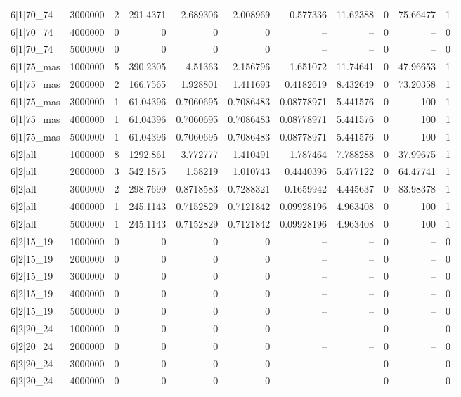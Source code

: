\begin{tabular}{lrrrrrrrrrr}
6|1|70\_74 & 3000000 & 2 & 291.4371 & 2.689306 & 2.008969 & 0.577336 & 11.62388 & 0 & 75.66477 & 1 \\
6|1|70\_74 & 4000000 & 0 & 0 & 0 & 0 & -- & -- & 0 & -- & 0 \\
6|1|70\_74 & 5000000 & 0 & 0 & 0 & 0 & -- & -- & 0 & -- & 0 \\
6|1|75\_mas & 1000000 & 5 & 390.2305 & 4.51363 & 2.156796 & 1.651072 & 11.74641 & 0 & 47.96653 & 1 \\
6|1|75\_mas & 2000000 & 2 & 166.7565 & 1.928801 & 1.411693 & 0.4182619 & 8.432649 & 0 & 73.20358 & 1 \\
6|1|75\_mas & 3000000 & 1 & 61.04396 & 0.7060695 & 0.7086483 & 0.08778971 & 5.441576 & 0 & 100 & 1 \\
6|1|75\_mas & 4000000 & 1 & 61.04396 & 0.7060695 & 0.7086483 & 0.08778971 & 5.441576 & 0 & 100 & 1 \\
6|1|75\_mas & 5000000 & 1 & 61.04396 & 0.7060695 & 0.7086483 & 0.08778971 & 5.441576 & 0 & 100 & 1 \\
6|2|all & 1000000 & 8 & 1292.861 & 3.772777 & 1.410491 & 1.787464 & 7.788288 & 0 & 37.99675 & 1 \\
6|2|all & 2000000 & 3 & 542.1875 & 1.58219 & 1.010743 & 0.4440396 & 5.477122 & 0 & 64.47741 & 1 \\
6|2|all & 3000000 & 2 & 298.7699 & 0.8718583 & 0.7288321 & 0.1659942 & 4.445637 & 0 & 83.98378 & 1 \\
6|2|all & 4000000 & 1 & 245.1143 & 0.7152829 & 0.7121842 & 0.09928196 & 4.963408 & 0 & 100 & 1 \\
6|2|all & 5000000 & 1 & 245.1143 & 0.7152829 & 0.7121842 & 0.09928196 & 4.963408 & 0 & 100 & 1 \\
6|2|15\_19 & 1000000 & 0 & 0 & 0 & 0 & -- & -- & 0 & -- & 0 \\
6|2|15\_19 & 2000000 & 0 & 0 & 0 & 0 & -- & -- & 0 & -- & 0 \\
6|2|15\_19 & 3000000 & 0 & 0 & 0 & 0 & -- & -- & 0 & -- & 0 \\
6|2|15\_19 & 4000000 & 0 & 0 & 0 & 0 & -- & -- & 0 & -- & 0 \\
6|2|15\_19 & 5000000 & 0 & 0 & 0 & 0 & -- & -- & 0 & -- & 0 \\
6|2|20\_24 & 1000000 & 0 & 0 & 0 & 0 & -- & -- & 0 & -- & 0 \\
6|2|20\_24 & 2000000 & 0 & 0 & 0 & 0 & -- & -- & 0 & -- & 0 \\
6|2|20\_24 & 3000000 & 0 & 0 & 0 & 0 & -- & -- & 0 & -- & 0 \\
6|2|20\_24 & 4000000 & 0 & 0 & 0 & 0 & -- & -- & 0 & -- & 0 \\

\end{tabular}
